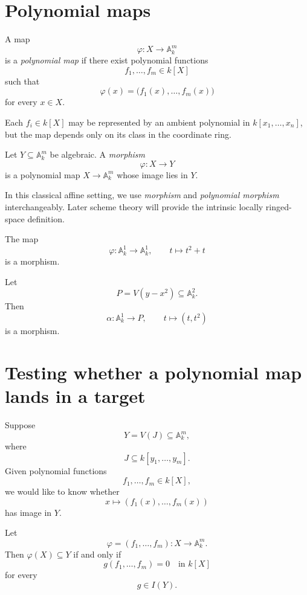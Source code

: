 \section{Polynomial maps}

\begin{definition}
A map
\[
\varphi:X\longrightarrow\mathbb A_k^m
\]
is a \emph{polynomial map} if there exist polynomial functions
\[
f_1,\dots,f_m\in k[X]
\]
such that
\[
\varphi(x)
=
\bigl(f_1(x),\dots,f_m(x)\bigr)
\]
for every \(x\in X\).
\end{definition}

Each \(f_i\in k[X]\) may be represented by an ambient polynomial in
\(k[x_1,\dots,x_n]\), but the map depends only on its class in the coordinate ring.

\begin{definition}
Let \(Y\subseteq\mathbb A_k^m\) be algebraic.  A \emph{morphism}
\[
\varphi:X\longrightarrow Y
\]
is a polynomial map \(X\to\mathbb A_k^m\) whose image lies in \(Y\).
\end{definition}

In this classical affine setting, we use \emph{morphism} and \emph{polynomial morphism}
interchangeably.  Later scheme theory will provide the intrinsic locally ringed-space
definition.

\begin{example}
The map
\[
\varphi:\mathbb A_k^1\longrightarrow\mathbb A_k^1,
\qquad
t\longmapsto t^2+t
\]
is a morphism.
\end{example}

\begin{example}
Let
\[
P=V(y-x^2)\subseteq\mathbb A_k^2.
\]
Then
\[
\alpha:\mathbb A_k^1\longrightarrow P,
\qquad
t\longmapsto(t,t^2)
\]
is a morphism.
\end{example}

\section{Testing whether a polynomial map lands in a target}

Suppose
\[
Y=V(J)\subseteq\mathbb A_k^m,
\]
where
\[
J\subseteq k[y_1,\dots,y_m].
\]
Given polynomial functions
\[
f_1,\dots,f_m\in k[X],
\]
we would like to know whether
\[
x\longmapsto(f_1(x),\dots,f_m(x))
\]
has image in \(Y\).

\begin{proposition}
\label{prop:vi04-target-test}
Let
\[
\varphi=(f_1,\dots,f_m):X\to\mathbb A_k^m.
\]
Then \(\varphi(X)\subseteq Y\) if and only if
\[
g(f_1,\dots,f_m)=0
\quad\text{in }k[X]
\]
for every
\[
g\in I(Y).
\]
\end{proposition}

